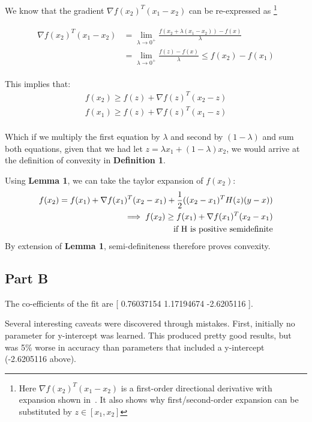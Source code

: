 \documentclass[11pt]{article}
\begin{document}
We know that the gradient $\nabla f(x_2)^T(x_1-x_2)$ can be re-expressed as
\footnote{Here $\nabla f(x_2)^T(x_1-x_2)$ is a first-order directional derivative
with expansion shown in~\cite{directionalDerivative}. It also shows why first/second-order 
expansion can be substituted by $z \in [x_1,x_2]$}

\begin{align}
	\begin{split}
		\nabla f(x_2)^T(x_1-x_2) &= \lim_{\lambda \rightarrow 0^+}\frac{f(x_2+\lambda(x_1-x_2))-f(x)}{\lambda} \\
		&= \lim_{\lambda \rightarrow 0^+}\frac{f(z)-f(x)}{\lambda} \leq f(x_2) - f(x_1)
	\end{split}
\end{align}

This implies that:
\begin{align}
	f(x_2) \geq f(z) + \nabla f(z)^T(x_2-z) \\
	f(x_1) \geq f(z) + \nabla f(z)^T(x_1-z) \\
\end{align}

Which if we multiply the first equation by $\lambda$ and second by $(1-\lambda)$ and sum 
both equations, given that we had let $z=\lambda x_1 + (1-\lambda)x_2$,  we would arrive 
at the definition of convexity in \textbf{Definition 1}.

Using \textbf{Lemma 1}, we can take the taylor expansion of $f(x_2)$:
\begin{align}
	\begin{split}
	f(x_2) = f(x_1) + \nabla f(x_1)^T(x_2-x_1) + \frac{1}{2}((x_2-x_1)^TH(z)(y-x)) \\
	\implies f(x_2) \geq f(x_1) + \nabla f(x_1)^T(x_2-x_1) \\ 
	\textnormal{if H is positive semidefinite}
	\end{split}
\end{align}
By extension of \textbf{Lemma 1}, semi-definiteness therefore proves convexity. 


\subsection*{Part B}

The co-efficients of the fit are [ 0.76037154  1.17194674 -2.6205116 ].

Several interesting caveats were discovered through mistakes. First, initially no 
parameter for y-intercept was learned. This produced pretty good results, but was 
5\% worse in accuracy than parameters that included a y-intercept (-2.6205116 above). 
\end{document}
